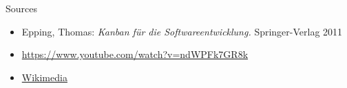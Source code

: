 \documentclass[12pt]{beamer}
\newcommand{\bi}{\begin{itemize}}
\newcommand{\ei}{\end{itemize}}
\begin{document}
		
		\begin{frame}{Sources}
			\bi
				\item Epping, Thomas: \textit{Kanban für die Softwareentwicklung.} Springer-Verlag 2011
				\item \url{https://www.youtube.com/watch?v=ndWPFk7GR8k}
				\item \href{https://upload.wikimedia.org/wikipedia/commons/d/d3/Simple-kanban-board-.jpg}{Wikimedia}
			\ei
		\end{frame}
	
		
	
\end{document}
